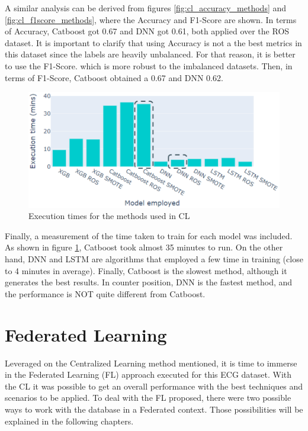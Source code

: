 A similar analysis can be derived from figures \ref{fig:cl_accuracy_methods} and \ref{fig:cl_f1score_methods}, where the Accuracy and F1-Score are shown. In terms of Accuracy, Catboost got 0.67 and DNN got 0.61, both applied over the ROS dataset. It is important to clarify that using Accuracy is not a the best metrics in this dataset since the labels are heavily unbalanced. For that reason, it is better to use the F1-Score. which is more robust to the imbalanced datasets. Then, in terms of F1-Score, Catboost obtained a 0.67 and DNN 0.62.

\begin{figure}[H]
\centering
\includegraphics[scale=0.5]{img/times_cl.PNG}
\caption{Execution times for the methods used in CL}
\label{fig:times_cl}
\end{figure}

Finally, a measurement of the time taken to train for each model was included. As shown in figure \ref{fig:times_cl}, Catboost took almost 35 minutes to run. On the other hand, DNN and LSTM are algorithms that employed a few time in training (close to 4 minutes in average). Finally, Catboost is the slowest method, although it generates the best results. In counter position, DNN is the fastest method, and the performance is NOT quite different from Catboost.


\section{Federated Learning} \label{5FL}

Leveraged on the Centralized Learning method mentioned, it is time to immerse in the Federated Learning (FL) approach executed for this ECG dataset. With the CL it was possible to get an overall performance with the best techniques and scenarios to be applied. To deal with the FL proposed, there were two possible ways to work with the database in a Federated context. Those possibilities will be explained in the following chapters.

